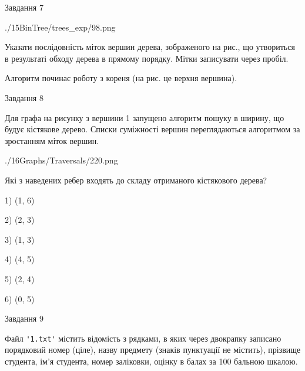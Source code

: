 \documentclass[12pt, ukrainian]{article}
\def\code#1{\Verb!#1!}
\begin{document}
{\vspace{10mm}\par

\newpage
\begin{minipage}[t]{9.7cm}
               
{\begin{center}Завдання {7}\end{center}}
\vspace{-6mm}

\begin{center}
	{./15BinTree/trees_exp/98.png}
\end{center}
Указати послідовність міток вершин дерева, зображеного на рис., що утвориться в результаті обходу дерева в прямому порядку. Мітки записувати через пробіл.\par Алгоритм починає роботу з кореня (на рис. це верхня вершина).\par

\end{minipage}
\vline \hspace{8mm}
\begin{minipage}[t]{8.0cm}
               
{\begin{center}Завдання {8}\end{center}}
\vspace{-6mm}
Для графа на рисунку з вершини 1 запущено алгоритм пошуку в ширину, що будує кістякове дерево. Списки суміжності вершин переглядаються алгоритмом за зростанням міток вершин.\par
\begin{center}
	{./16Graphs/Traversals/220.png}
\end{center}
\par Які з наведених ребер входять до складу отриманого кістякового дерева?\par
1) (1, 6)\par
2) (2, 3)\par
3) (1, 3)\par
4) (4, 5)\par
5) (2, 4)\par
6) (0, 5)\par
{\vskip 15pt} \par

\end{minipage}

               
{\begin{center}Завдання {9}\end{center}}
\vspace{-6mm}
Файл \code{'1.txt'} містить відомість з рядками, в яких через двокрапку записано поряд\-ковий номер (ціле), назву предмету (знаків пунктуації не містить), прізвище студента, ім'я студента, номер заліковки, оцінку в балах за 100 бальною шкалою.

}
\end{document}
